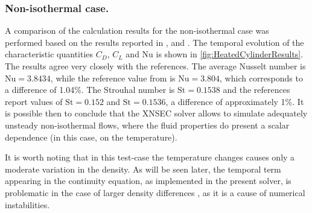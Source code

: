 \subsubsection{Non-isothermal case.}
A comparison of the calculation results for the non-isothermal case was performed based on the results reported in \textcite{shiHeatingEffectSteady2004}, \textcite{wangRelationshipEffectiveReynolds2000} and \textcite{henninkLowMachNumberFlow2022}.
The temporal evolution of the characteristic quantities $C_D$, $C_L$ and Nu is shown in \cref{fig:HeatedCylinderResults}. The results agree very closely with the references. The average Nusselt number is  $\text{Nu} = 3.8434$, while the reference value from \textcite{henninkLowMachNumberFlow2022} is $\text{Nu} = 3.804$, which corresponds to a difference of 1.04\%. The Strouhal number is $\text{St} = 0.1538$ and the references report values of $\text{St} = 0.152$ and $\text{St} = 0.1536$, a difference of approximately 1\%. It is possible then to conclude that the XNSEC solver allows to simulate adequately unsteady non-isothermal flows, where the fluid properties do present a scalar dependence (in this case, on the temperature). 

It is worth noting that in this test-case the temperature changes causes only a moderate variation in the density. As will be seen later, the temporal term appearing in the continuity equation, as implemented in the present solver, is problematic in the case of larger density differences \parencite{knikkerComparativeStudyHighorder2011}, as it is a cause of numerical instabilities.
\FloatBarrier